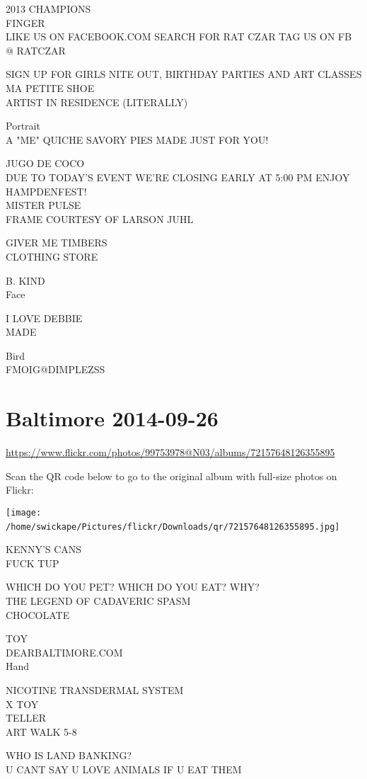\documentclass[10pt,letterpaper]{article}
\begin{document}
2013 CHAMPIONS\\
FINGER\\
LIKE US ON FACEBOOK.COM SEARCH FOR RAT CZAR TAG US ON FB @ RATCZAR

SIGN UP FOR GIRLS NITE OUT, BIRTHDAY PARTIES AND ART CLASSES\\
MA PETITE SHOE\\
ARTIST IN RESIDENCE (LITERALLY)

Portrait\\
A "ME" QUICHE SAVORY PIES MADE JUST FOR YOU!

JUGO DE COCO\\
DUE TO TODAY'S EVENT WE'RE CLOSING EARLY AT 5:00 PM ENJOY HAMPDENFEST!\\
MISTER PULSE\\
FRAME COURTESY OF LARSON JUHL

GIVER ME TIMBERS\\
CLOTHING STORE

B. KIND\\
Face

I LOVE DEBBIE\\
MADE

Bird\\
FMOIG@DIMPLEZSS
\

\section*{Baltimore 2014-09-26}

\url{https://www.flickr.com/photos/99753978@N03/albums/72157648126355895}

Scan the QR code below to go to the original album with full-size photos on Flickr:

\texttt{[image: /home/swickape/Pictures/flickr/Downloads/qr/72157648126355895.jpg]}
\

KENNY'S CANS\\
FUCK TUP

WHICH DO YOU PET?  WHICH DO YOU EAT?  WHY?\\
THE LEGEND OF CADAVERIC SPASM\\
CHOCOLATE

TOY\\
DEARBALTIMORE.COM\\
Hand

NICOTINE TRANSDERMAL SYSTEM\\
X TOY\\
TELLER\\
ART WALK 5{-}8

WHO IS LAND BANKING?\\
U CANT SAY U LOVE ANIMALS IF U EAT THEM
\
\end{document}
